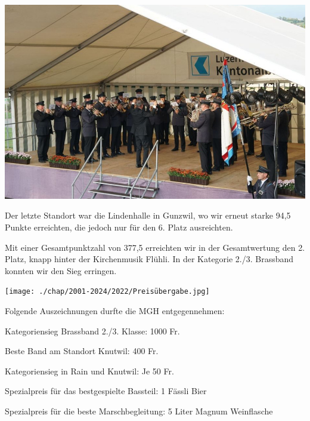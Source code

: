 \begin{history}
    \begin{MulticolFigure}
        \centering
        \includegraphics[width=0.9\linewidth]{./chap/2001-2024/2022/Knutwil-2.jpg}
    \end{MulticolFigure}

    Der letzte Standort war die Lindenhalle in Gunzwil, wo wir erneut starke
    94,5 Punkte erreichten, die jedoch nur für den 6. Platz ausreichten.

    Mit einer Gesamtpunktzahl von 377,5 erreichten wir in der Gesamtwertung den
    2. Platz, knapp hinter der Kirchenmusik Flühli. In der Kategorie 2./3.
    Brassband konnten wir den Sieg erringen.

    \begin{MulticolFigure}
        \centering
        \texttt{[image: ./chap/2001-2024/2022/Preisübergabe.jpg]}
    \end{MulticolFigure}

    \noindent Folgende Auszeichnungen durfte die MGH entgegennehmen:

    Kategoriensieg Brassband 2./3. Klasse: 1000 Fr.

    Beste Band am Standort Knutwil: 400 Fr.

    Kategoriensieg in Rain und Knutwil: Je 50 Fr.

    Spezialpreis für das bestgespielte Bassteil: 1 Fässli Bier

    Spezialpreis für die beste Marschbegleitung: 5 Liter Magnum Weinflasche


\end{history}

